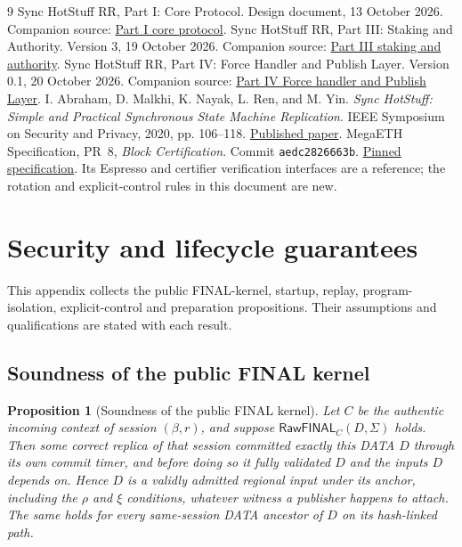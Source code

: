\documentclass[11pt,a4paper]{article}
\newcommand{\tagg}[1]{\ensuremath{\mathsf{#1}}}
\newtheorem{proposition}[proposition]{Proposition}
\newcounter{protocol}
\begin{document}
\begingroup\small
\begin{thebibliography}{9}
Sync HotStuff RR, Part I: Core Protocol. Design document, 13 October 2026.
Companion source: \href{run:sync_hotstuff_rr_part1_core.tex}{Part I core protocol}.
Sync HotStuff RR, Part III: Staking and Authority. Version 3, 19 October 2026.
Companion source: \href{run:sync_hotstuff_rr_part3_staking_v3.tex}{Part III staking and authority}.
Sync HotStuff RR, Part IV: Force Handler and Publish Layer.
Version 0.1, 20 October 2026.
Companion source: \href{run:sync_hotstuff_rr_part4_force_v0_1.tex}{Part IV Force handler and Publish Layer}.
I. Abraham, D. Malkhi, K. Nayak, L. Ren, and M. Yin.
\emph{Sync HotStuff: Simple and Practical Synchronous State Machine Replication}.
IEEE Symposium on Security and Privacy, 2020, pp. 106--118.
\href{https://conferences.computer.org/sp/pdfs/sp/2020/349700a106.pdf}{Published paper}.
MegaETH Specification, PR~8, \emph{Block Certification}.
Commit \texttt{aedc2826663b}.
\href{https://github.com/megaeth-labs/specification/tree/aedc2826663b134ee25d26bea17e70c6d23d321c/specs/block-certification}{Pinned specification}.
Its Espresso and certifier verification interfaces are a reference;
the rotation and explicit-control rules in this document are new.
\end{thebibliography}
\endgroup
\appendix
{}
\section{Security and lifecycle guarantees}
\label{app:security}
This appendix collects the public FINAL-kernel, startup, replay,
program-isolation, explicit-control and preparation propositions.
Their assumptions and qualifications are stated with each result.

\subsection{Soundness of the public FINAL kernel}
\label{app:final-kernel-proof}
\begin{proposition}[Soundness of the public FINAL kernel]
\label{prop:final-kernel-soundness}
Let $C$ be the authentic incoming context of session $(\beta,r)$, and
suppose $\tagg{RawFINAL}_C(D,\Sigma)$ holds. Then some correct replica of
that session committed exactly this DATA $D$ through its own commit
timer, and before doing so it fully validated $D$ and the inputs $D$
depends on. Hence $D$ is a validly admitted regional input under its
anchor, including the $\rho$ and $\xi$ conditions, whatever witness a
publisher happens to attach. The same holds for every same-session DATA
ancestor of $D$ on its hash-linked path.
\end{proposition}
\end{document}

